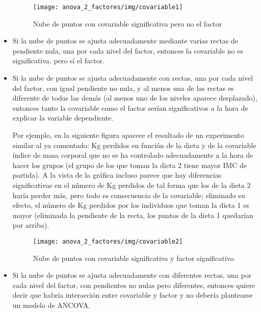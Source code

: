 \begin{itemize}
\begin{figure}[h!]
\begin{center}
\texttt{[image: anova\_2\_factores/img/covariable1]}
\caption{Nube de puntos con covariable significativa pero no el factor}
\end{center}
\end{figure}

\item Si la nube de puntos se ajusta adecuadamente mediante varias rectas de pendiente nula, una por cada nivel del factor, entonces la
covariable no es significativa, pero sí el factor.

\item Si la nube de puntos se ajusta adecuadamente con rectas, una por cada nivel del factor, con igual pendiente no nula, y al menos una de
las rectas es diferente de todas las demás (al menos uno de los niveles aparece desplazado), entonces tanto la covariable como el factor
serían significativos a la hora de explicar la variable dependiente.

Por ejemplo, en la siguiente figura aparece el resultado de un experimento similar al ya comentado: Kg perdidos en función de la dieta y de
la covariable índice de masa corporal que no se ha controlado adecuadamente a la hora de hacer los grupos (el grupo de los que toman la
dieta 2 tiene mayor IMC de partida). A la vista de la gráfica incluso parece que hay diferencias significativas en el número de Kg perdidos
de tal forma que los de la dieta 2 haría perder más, pero todo es consecuencia de la covariable; eliminado su efecto, el número de Kg
perdidos por los individuos que toman la dieta 1 es mayor (eliminada la pendiente de la recta, los puntos de la dieta 1 quedarían por
arriba).

\begin{figure}[h!]
\begin{center}
\texttt{[image: anova\_2\_factores/img/covariable2]}
\caption{Nube de puntos con covariable significativa y factor significativo}
\end{center}
\end{figure}

\item Si la nube de puntos se ajusta adecuadamente con diferentes rectas, una por cada nivel del factor, con pendientes no nulas pero
diferentes, entonces quiere decir que habría interacción entre covariable y factor y no debería plantearse un modelo de ANCOVA.
\end{itemize}


